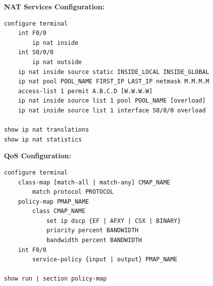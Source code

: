 \documentclass[12pt]{article}
\begin{document}
	\textbf{NAT Services Configuration:}
	\begin{lstlisting}
configure terminal
	int F0/0
		ip nat inside
	int S0/0/0
		ip nat outside
	ip nat inside source static INSIDE_LOCAL INSIDE_GLOBAL
	ip nat pool POOL_NAME FIRST_IP LAST_IP netmask M.M.M.M
	access-list 1 permit A.B.C.D [W.W.W.W]
	ip nat inside source list 1 pool POOL_NAME [overload]
	ip nat inside source list 1 interface S0/0/0 overload

show ip nat translations
show ip nat statistics
	\end{lstlisting}

	\textbf{QoS Configuration:}
	\begin{lstlisting}
configure terminal
	class-map [match-all | match-any] CMAP_NAME
		match protocol PROTOCOL
	policy-map PMAP_NAME
		class CMAP_NAME
			set ip dscp {EF | AFXY | CSX | BINARY}
			priority percent BANDWIDTH
			bandwidth percent BANDWIDTH
	int F0/0
		service-policy {input | output} PMAP_NAME
		
show run | section policy-map
	\end{lstlisting}
\end{document}
